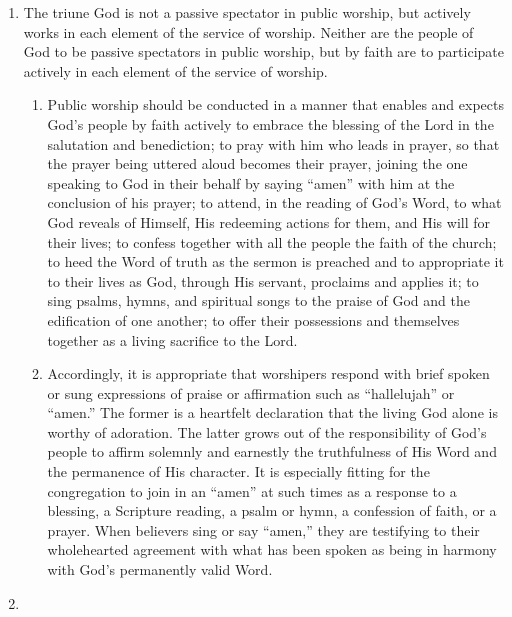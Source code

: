 \documentclass[
]{book}
\providecommand{\tightlist}{%
  \setlength{\itemsep}{0pt}\setlength{\parskip}{0pt}}
\begin{document}
\begin{enumerate}
\def\labelenumi{\arabic{enumi}.}
\setcounter{enumi}{1}
\tightlist
\item
  The triune God is not a passive spectator in public worship, but actively works in each element of the service of worship. Neither are the people of God to be passive spectators in public worship, but by faith are to participate actively in each element of the service of worship.

  \begin{enumerate}
  \def\labelenumii{\alph{enumii}.}
  \tightlist
  \item
    Public worship should be conducted in a manner that enables and expects God's people by faith actively to embrace the blessing of the Lord in the salutation and benediction; to pray with him who leads in prayer, so that the prayer being uttered aloud becomes their prayer, joining the one speaking to God in their behalf by saying ``amen'' with him at the conclusion of his prayer; to attend, in the reading of God's Word, to what God reveals of Himself, His redeeming actions for them, and His will for their lives; to confess together with all the people the faith of the church; to heed the Word of truth as the sermon is preached and to appropriate it to their lives as God, through His servant, proclaims and applies it; to sing psalms, hymns, and spiritual songs to the praise of God and the edification of one another; to offer their possessions and themselves together as a living sacrifice to the Lord.
  \item
    Accordingly, it is appropriate that worshipers respond with brief spoken or sung expressions of praise or affirmation such as ``hallelujah'' or ``amen.'' The former is a heartfelt declaration that the living God alone is worthy of adoration. The latter grows out of the responsibility of God's people to affirm solemnly and earnestly the truthfulness of His Word and the permanence of His character. It is especially fitting for the congregation to join in an ``amen'' at such times as a response to a blessing, a Scripture reading, a psalm or hymn, a confession of faith, or a prayer. When believers sing or say ``amen,'' they are testifying to their wholehearted agreement with what has been spoken as being in harmony with God's permanently valid Word.
  \end{enumerate}
\item

\end{enumerate}
\end{document}
